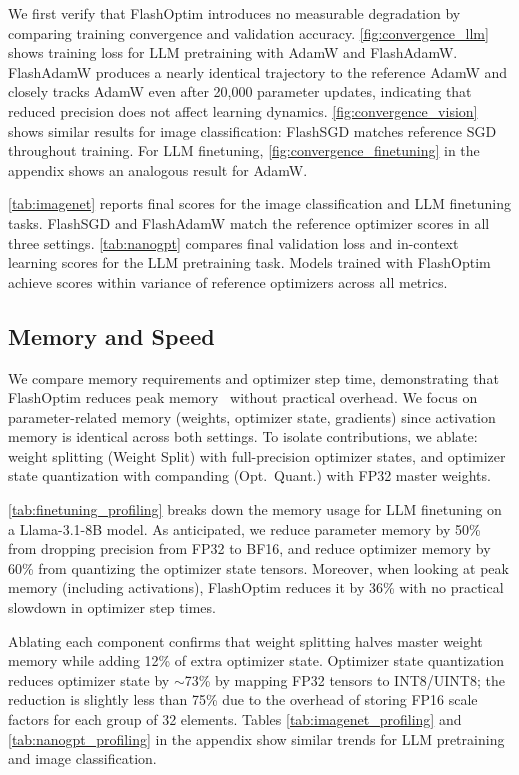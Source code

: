 \documentclass[10pt,twocolumn,letterpaper]{article}
\theoremstyle{plain}
\theoremstyle{definition}
\theoremstyle{remark}
\newcommand{\flashOptim}{FlashOptim\xspace}
\newcommand{\flashAdam}{FlashAdamW\xspace}
\newcommand{\flashSGD}{FlashSGD\xspace}
\begin{document}
We first verify that \flashOptim introduces no measurable degradation by comparing training convergence and validation accuracy.
\autoref{fig:convergence_llm} shows training loss for LLM pretraining with AdamW and \flashAdam.
\flashAdam produces a nearly identical trajectory to the reference AdamW and closely tracks AdamW even after 20,000 parameter updates, indicating that reduced precision does not affect learning dynamics.
\autoref{fig:convergence_vision} shows similar results for image classification: \flashSGD matches reference SGD throughout training.
For LLM finetuning, \autoref{fig:convergence_finetuning} in the appendix shows an analogous result for AdamW. 



\autoref{tab:imagenet} reports final scores for the image classification and LLM finetuning tasks. \flashSGD and \flashAdam match the reference optimizer scores in all three settings.  \autoref{tab:nanogpt} compares final validation loss and in-context learning scores for the LLM pretraining task. 
Models trained with \flashOptim achieve scores within variance of reference optimizers across all metrics.



\subsection{Memory and Speed} \label{sec:memory}

We compare memory requirements and optimizer step time, demonstrating that \flashOptim reduces peak memory~\citep{pytorch_cuda_memory_stats} without practical overhead. We focus on parameter-related memory (weights, optimizer state, gradients) since activation memory is identical across both settings.
To isolate contributions, we ablate: weight splitting (Weight Split) with full-precision optimizer states, and optimizer state quantization with companding (Opt.\ Quant.) with FP32 master weights.

\autoref{tab:finetuning_profiling} breaks down the memory usage for LLM finetuning on a Llama-3.1-8B model. As anticipated, we reduce parameter memory by 50\% from dropping precision from FP32 to BF16, and reduce optimizer memory by 60\% from quantizing the optimizer state tensors. Moreover, when looking at peak memory (including activations), \flashOptim reduces it by 36\% with no practical slowdown in optimizer step times.

Ablating each component confirms that weight splitting halves master weight memory while adding 12\% of extra optimizer state. Optimizer state quantization reduces optimizer state by $\sim$73\% by mapping FP32 tensors to INT8/UINT8; the reduction is slightly less than 75\% due to the overhead of storing FP16 scale factors for each group of 32 elements.
Tables \ref{tab:imagenet_profiling} and \ref{tab:nanogpt_profiling} in the appendix show similar trends for LLM pretraining and image classification.
\end{document}
